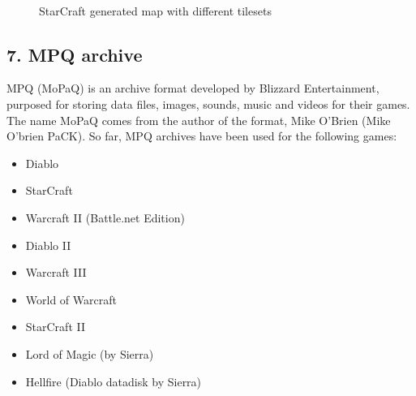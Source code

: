 \documentclass[letterpaper]{article}
\begin{document}
\begin{figure}[ht]
  \centering
  ~ %
  ~ %
  \caption{StarCraft generated map with different tilesets}
  \label{fig:final-maps}
\end{figure}

\subsection{7. MPQ archive}
MPQ (MoPaQ) is an archive format developed by Blizzard Entertainment, purposed for storing data files, images, sounds, music and videos for their games. The name MoPaQ comes from the author of the format, Mike O'Brien (Mike O'brien PaCK). So far, MPQ archives have been used for the following games:
\begin{itemize}
	\item Diablo
	\item StarCraft
	\item Warcraft II (Battle.net Edition)
	\item Diablo II
	\item Warcraft III
	\item World of Warcraft
	\item StarCraft II
	\item Lord of Magic (by Sierra)
	\item Hellfire (Diablo datadisk by Sierra)
\end{itemize}
\end{document}
